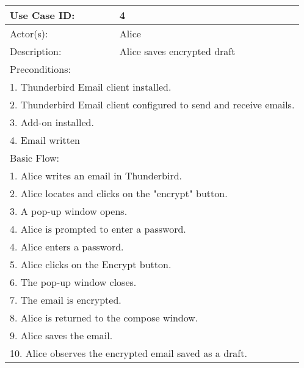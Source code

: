 \begin{longtable} {|p{3cm}|p{9cm}|} %
	\hline
Use Case ID: & 4\\
	\hline
Actor(s): & Alice \\
	\hline
Description: & Alice saves encrypted draft \\
	\hline
	\multicolumn{2}{|l|}{Preconditions:} \\
	\multicolumn{2}{|l|}{1. Thunderbird Email client installed.} \\
	\multicolumn{2}{|l|}{2. Thunderbird Email client configured to send and receive emails.}\\
	\multicolumn{2}{|l|}{3. Add-on installed.} \\
	\multicolumn{2}{|l|}{4. Email written} \\
	\hline
	\multicolumn{2}{|l|}{Basic Flow:} \\
	\multicolumn{2}{|l|}{1. Alice writes an email in Thunderbird.}\\
	\multicolumn{2}{|l|}{2. Alice locates and clicks on the "encrypt" button.} \\
	\multicolumn{2}{|l|}{3. A pop-up window opens.} \\
	\multicolumn{2}{|l|}{4. Alice is prompted to enter a password.}\\
	\multicolumn{2}{|l|}{4. Alice enters a password.}\\
	\multicolumn{2}{|l|}{5. Alice clicks on the Encrypt button.}\\
	\multicolumn{2}{|l|}{6. The pop-up window closes.}\\
	\multicolumn{2}{|l|}{7. The email is encrypted.}\\
	\multicolumn{2}{|l|}{8. Alice is returned to the compose window.}\\
	\multicolumn{2}{|l|}{9. Alice saves the email.}\\
	\multicolumn{2}{|l|}{10. Alice observes the encrypted email saved as a draft.}\\
	

\end{longtable}
